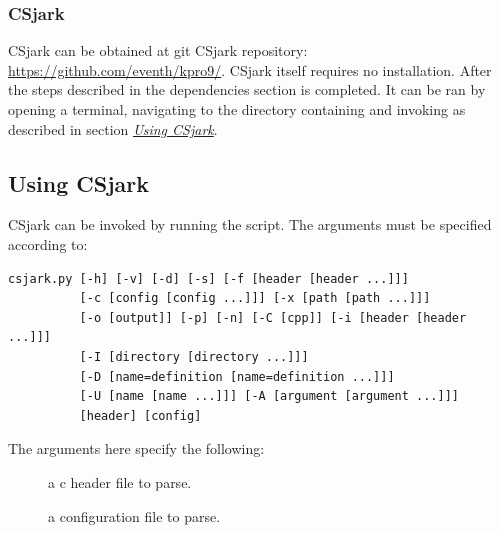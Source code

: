 \documentclass[A4paper,10pt,english]{sphinxmanual}
\begin{document}
\subsubsection{CSjark}
\label{user/install:csjark}
CSjark can be obtained at git CSjark repository: \href{https://github.com/eventh/kpro9/}{https://github.com/eventh/kpro9/}.
CSjark itself requires no installation. After the steps described in the dependencies section is completed. It can be ran by opening a terminal, navigating to the directory containing  and invoking as described in section {\hyperref[user/use:use]{\emph{Using CSjark}}}.


\subsection{Using CSjark}
\label{user/use:using-csjark}\label{user/use:use}\label{user/use::doc}
CSjark can be invoked by running the  script. The arguments must be specified according to:

\begin{Verbatim}[commandchars=\\\{\}]
csjark.py [-h] [-v] [-d] [-s] [-f [header [header ...]]]
          [-c [config [config ...]]] [-x [path [path ...]]]
          [-o [output]] [-p] [-n] [-C [cpp]] [-i [header [header ...]]]
          [-I [directory [directory ...]]]
          [-D [name=definition [name=definition ...]]]
          [-U [name [name ...]]] [-A [argument [argument ...]]]
          [header] [config]
\end{Verbatim}

The arguments here specify the following:
\begin{description}
\item[{}] \leavevmode
a c header file to parse.

\item[{}] \leavevmode
a configuration file to parse.

\end{description}
\end{document}

